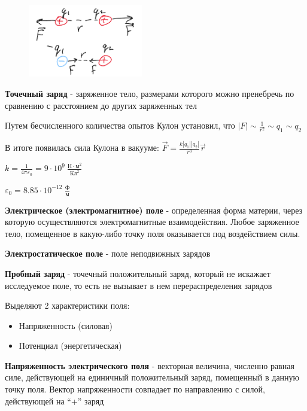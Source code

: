 \documentclass[12pt]{article}
\begin{document}
    \begin{minipage}{\textwidth}
        \begin{figure}
            \includegraphics[width=5cm]{physics1/images/physics1_2024_11_15_3}
        \end{figure}

        \textbf{Точечный заряд} - заряженное тело, размерами которого можно пренебречь по сравнению с расстоянием до других заряженных тел

        Путем бесчисленного количества опытов Кулон установил, что $|F| \sim \frac{1}{r^2} \sim q_1 \sim q_2$

        В итоге появилась сила Кулона в вакууме: 
        $\vec{F} = \frac{k|q_1| |q_2|}{r^3} \vec{r}$

        $k = \frac{1}{4\pi \varepsilon_0} = 9 \cdot 10^9 \ \frac{\text{Н} \cdot \text{м}^2}{\text{Кл}^2}$

        $\varepsilon_0 = 8.85 \cdot 10^{-12} \ \frac{\text{Ф}}{\text{м}}$
    \end{minipage}
    

    \textbf{Электрическое (электромагнитное) поле} - определенная форма материи,
    через которую осуществляются электромагнитные взаимодействия. Любое заряженное тело, помещенное в какую-либо точку поля
    оказывается под воздействием силы.

    \textbf{Электростатическое поле} - поле неподвижных зарядов

    \textbf{Пробный заряд} - точечный положительный заряд, который не искажает исследуемое поле, то есть не вызывает в нем перераспределения зарядов

    Выделяют 2 характеристики поля:

    \begin{itemize}
        \item Напряженность (силовая)

        \item Потенциал (энергетическая)
    \end{itemize}

    \textbf{Напряженность электрического поля} - векторная величина, численно равная силе, действующей на единичный положительный заряд, помещенный в данную точку поля.
    Вектор напряженности совпадает по направлению с силой, действующей на \enquote{+} заряд
\end{document}
